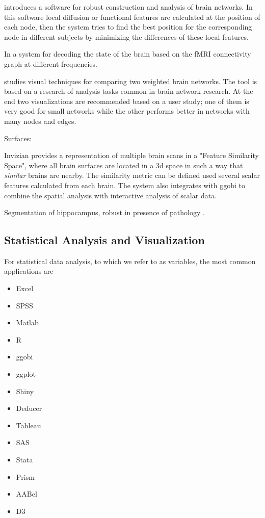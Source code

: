 \autocite{li_visual_2012} introduces a software for robust construction and analysis of brain networks. In this software local diffusion or functional features are calculated at the position of each node, then the system tries to find the best position for the corresponding node in different subjects by minimizing the differences of these local features.

In \autocite{richiardi_decoding_2011} a system for decoding the state of the brain based on the fMRI connectivity graph at different frequencies.

\autocite{alper_weighted_2013} studies visual techniques for comparing two weighted brain networks. The tool is based on a research of analysis tasks common in brain network research. At the end two visualizations are recommended based on a user study; one of them is very good for small networks while the other performs better in networks with many nodes and edges.

Surfaces:

Invizian \autocite{bowman_query-based_2011} provides a representation of multiple brain scans in a "Feature Similarity Space", where all brain surfaces are located in a 3d space in such a way that \emph{similar} brains are nearby. The similarity metric can be defined used several scalar features calculated from each brain. The system also integrates with ggobi to combine the spatial analysis with interactive analysis of scalar data.

\begin{table}
	\centering
		\begin{tabular}
			
		\end{tabular}
	\label{tab_related_applications}
\end{table}


Segmentation of hippocampus, robust in presence of pathology \autocite{kim_robust_2011}.


\subsection{Statistical Analysis and Visualization}
For statistical data analysis, to which we refer to as variables, the most common applications are
\begin{itemize}
	\item Excel
	\item SPSS
	\item Matlab
	\item R
	\item ggobi
	\item ggplot
	\item Shiny
	\item Deducer
	\item Tableau
	\item SAS
	\item Stata
	\item Prism
	\item AABel
	\item D3
\end{itemize}


